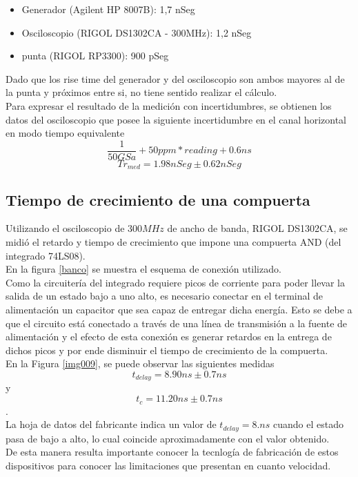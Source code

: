 \documentclass[a4paper,10pt]{article}
\begin{document}
		\begin{itemize}
			\item Generador (Agilent HP 8007B): 1,7 nSeg  
			\item Osciloscopio (RIGOL DS1302CA - 300MHz): 1,2 nSeg
			\item punta (RIGOL RP3300): 900 pSeg
		\end{itemize}
		\indent Dado que los rise time del generador y del osciloscopio son 
		ambos mayores al de la punta y próximos entre si, no tiene sentido 
		realizar el cálculo. \\
		\indent Para expresar el resultado de la medición con incertidumbres,
		se obtienen los datos del osciloscopio que posee la siguiente 
		incertidumbre en el canal horizontal en modo tiempo equivalente
		$$ \frac{1}{50GSa} + 50ppm * reading + 0.6 ns$$
		$$ Tr_{med} = 1.98 nSeg \pm 0.62 nSeg$$
		
	\subsection{Tiempo de crecimiento de una compuerta}
			\indent Utilizando el osciloscopio de $300MHz$ de ancho de banda, RIGOL 
			DS1302CA, se midi\'o el retardo y tiempo de crecimiento que impone una 
			compuerta AND (del integrado 74LS08). \\
			\indent En la figura \ref{banco} se muestra el esquema de conexi\'on 
			utilizado. \\
		 	\indent Como la circuitería del integrado requiere picos de corriente para 
			poder llevar la salida de un estado bajo a uno alto, es necesario conectar 
			en el terminal de alimentación un capacitor que sea capaz de entregar dicha 
			energía. Esto se debe a que el circuito está conectado a través de una línea
			de transmisión a la fuente de alimentación y el efecto de esta conexión es 
			generar retardos en la entrega de dichos picos y por ende disminuir el 
			tiempo de crecimiento de la compuerta.\\
			\indent En la Figura \ref{img009}, se puede observar las siguientes medidas 
			$$t_{delay}=8.90ns \pm0.7ns$$y  $$t_{c}=11.20ns\pm0.7ns$$. \\
			\indent La hoja de datos del fabricante indica un valor de $t_{delay}=8.ns$ 
			cuando el estado pasa de bajo a alto, lo cual coincide aproximadamente con 
			el valor obtenido. \\
			\indent De esta manera resulta importante conocer la tecnlog\'ia de 
			fabricaci\'on de estos dispositivos para conocer las limitaciones que 
			presentan en cuanto velocidad.
			
\end{document}
